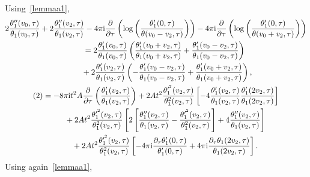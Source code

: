 \documentclass[10pt,a4paper]{amsart}
\numberwithin{equation}{section}
\begin{document}
Using~\eqref{lemmaa1},
\begin{gather*}
2\frac{\theta_1^{\prime\prime}(v_0,\tau)}{\theta_1(v_0,\tau)} +2\frac{\theta_1^{\prime\prime}(v_2,\tau)}{\theta_1(v_2,\tau)}-4\pi {\rm i} \frac{\partial}{\partial \tau}\left( \log\left(\frac{\theta_1^{\prime}(0,\tau)}{\theta(v_0-v_2,\tau)}\right)\right)-4\pi {\rm i} \frac{\partial}{\partial \tau}\left( \log\left(\frac{\theta_1^{\prime}(0,\tau)} {\theta(v_0+v_2,\tau)}\right)\right)
\\ \qquad
{}=2\frac{\theta_1^{\prime}(v_0,\tau)}{\theta_1(v_0,\tau)} \left(\frac{\theta_1^{\prime}(v_0+v_2,\tau)}{\theta_1(v_0+v_2,\tau)}
+\frac{\theta_1^{\prime}(v_0-v_2,\tau)}{\theta_1(v_0-v_2,\tau)}\right)
\\ \qquad\phantom{=} +2\frac{\theta_1^{\prime}(v_2,\tau)}{\theta_1(v_2,\tau)} \left( - \frac{\theta_1^{\prime}(v_0-v_2,\tau)}{\theta_1(v_0-v_2,\tau)} +\frac{\theta_1^{\prime}(v_0+v_2,\tau)}{\theta_1(v_0+v_2,\tau)}\right),
\\
(2)=-8\pi {\rm i}t^2A\frac{\partial}{\partial \tau}\left(\frac{\theta_1^{\prime}(v_2,\tau)}{\theta_1(v_2,\tau)}\right) +2At^2\frac{\theta_1^{\prime^2}(v_2,\tau)}{\theta_1^2(v_2,\tau)} \left[ - 4\frac{\theta_1^{\prime}(v_2,\tau)}{\theta_1(v_2,\tau)} \frac{\theta_1^{\prime}(2v_2,\tau)}{\theta_1(2v_2,\tau)}\right]
\\ \phantom{(2)=}
+2At^2\frac{\theta_1^{\prime^2}(v_2,\tau)}{\theta_1^2(v_2,\tau)} \left[2\left[\frac{\theta_1^{\prime\prime}(v_2,\tau)}{\theta_1(v_2,\tau)} -\frac{\theta_1^{\prime^2}(v_2,\tau)}{\theta_1^2(v_2,\tau)}\right]+4 \frac{\theta_1^{\prime\prime}(v_2,\tau)}{\theta_1(v_2,\tau)} \right]
\\ \hphantom{(2)=}
+2At^2\frac{\theta_1^{\prime^2}(v_2,\tau)}{\theta_1^2(v_2,\tau)}\left[-4\pi {\rm i}\frac{\partial_{\tau}\theta_1^{\prime}(0,\tau)}{\theta_1^{\prime}(0,\tau)}+4\pi {\rm i}\frac{\partial_{\tau}\theta_1(2v_2,\tau)}{\theta_1(2v_2,\tau)} \right].
\end{gather*}
Using again~\eqref{lemmaa1},
\end{document}
